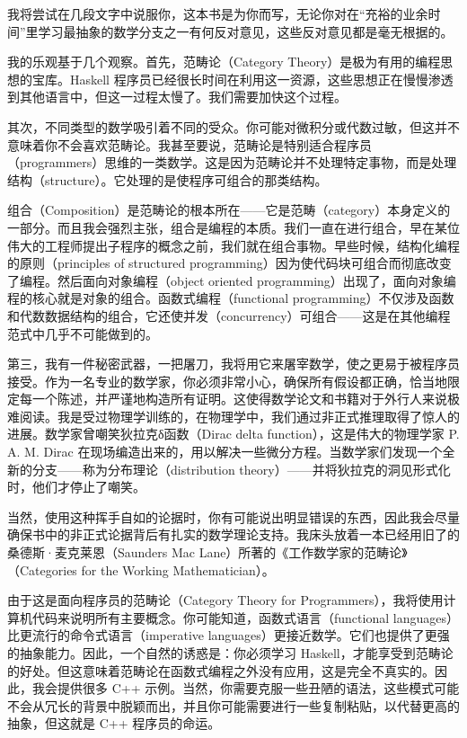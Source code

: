 \lettrine[lhang=0.17]{我}{将尝试}在几段文字中说服你，这本书是为你而写，无论你对在“充裕的业余时间”里学习最抽象的数学分支之一有何反对意见，这些反对意见都是毫无根据的。

我的乐观基于几个观察。首先，范畴论（Category Theory）是极为有用的编程思想的宝库。Haskell 程序员已经很长时间在利用这一资源，这些思想正在慢慢渗透到其他语言中，但这一过程太慢了。我们需要加快这个过程。

其次，不同类型的数学吸引着不同的受众。你可能对微积分或代数过敏，但这并不意味着你不会喜欢范畴论。我甚至要说，范畴论是特别适合程序员（programmers）思维的一类数学。这是因为范畴论并不处理特定事物，而是处理结构（structure）。它处理的是使程序可组合的那类结构。

组合（Composition）是范畴论的根本所在——它是范畴（category）本身定义的一部分。而且我会强烈主张，组合是编程的本质。我们一直在进行组合，早在某位伟大的工程师提出子程序的概念之前，我们就在组合事物。早些时候，结构化编程的原则（principles of structured programming）因为使代码块可组合而彻底改变了编程。然后面向对象编程（object oriented programming）出现了，面向对象编程的核心就是对象的组合。函数式编程（functional programming）不仅涉及函数和代数数据结构的组合，它还使并发（concurrency）可组合——这是在其他编程范式中几乎不可能做到的。

第三，我有一件秘密武器，一把屠刀，我将用它来屠宰数学，使之更易于被程序员接受。作为一名专业的数学家，你必须非常小心，确保所有假设都正确，恰当地限定每一个陈述，并严谨地构造所有证明。这使得数学论文和书籍对于外行人来说极难阅读。我是受过物理学训练的，在物理学中，我们通过非正式推理取得了惊人的进展。数学家曾嘲笑狄拉克δ函数（Dirac delta function），这是伟大的物理学家 P. A. M. Dirac 在现场编造出来的，用以解决一些微分方程。当数学家们发现一个全新的分支——称为分布理论（distribution theory）——并将狄拉克的洞见形式化时，他们才停止了嘲笑。

当然，使用这种挥手自如的论据时，你有可能说出明显错误的东西，因此我会尽量确保书中的非正式论据背后有扎实的数学理论支持。我床头放着一本已经用旧了的桑德斯·麦克莱恩（Saunders Mac Lane）所著的《工作数学家的范畴论》（Categories for the Working Mathematician）。

由于这是面向程序员的范畴论（Category Theory for Programmers），我将使用计算机代码来说明所有主要概念。你可能知道，函数式语言（functional languages）比更流行的命令式语言（imperative languages）更接近数学。它们也提供了更强的抽象能力。因此，一个自然的诱惑是：你必须学习 Haskell，才能享受到范畴论的好处。但这意味着范畴论在函数式编程之外没有应用，这是完全不真实的。因此，我会提供很多 C++ 示例。当然，你需要克服一些丑陋的语法，这些模式可能不会从冗长的背景中脱颖而出，并且你可能需要进行一些复制粘贴，以代替更高的抽象，但这就是 C++ 程序员的命运。

